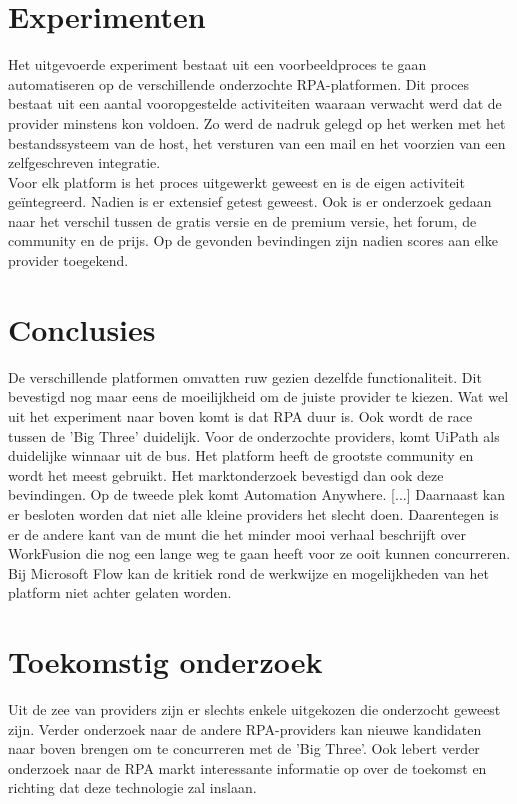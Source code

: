 \documentclass[a0,portrait]{a0poster}
\begin{document}
\begin{multicols}{2}
\section*{Experimenten}
\color{black}
Het uitgevoerde experiment bestaat uit een voorbeeldproces te gaan automatiseren op de verschillende onderzochte RPA-platformen. Dit proces bestaat uit een aantal vooropgestelde activiteiten waaraan verwacht werd dat de provider minstens kon voldoen. Zo werd de nadruk gelegd op het werken met het bestandssysteem van de host, het versturen van een mail en het voorzien van een zelfgeschreven integratie.\\
Voor elk platform is het proces uitgewerkt geweest en is de eigen activiteit geïntegreerd. Nadien is er extensief getest geweest. Ook is er onderzoek gedaan naar het verschil tussen de gratis versie en de premium versie, het forum, de community en de prijs. Op de gevonden bevindingen zijn nadien scores aan elke provider toegekend.

\color{HoGentAccent1} 
\section*{Conclusies}
\color{black}
De verschillende platformen omvatten ruw gezien dezelfde functionaliteit. Dit bevestigd nog maar eens de moeilijkheid om de juiste provider te kiezen. Wat wel uit het experiment naar boven komt is dat RPA duur is. Ook wordt de race tussen de 'Big Three' duidelijk. Voor de onderzochte providers, komt UiPath als duidelijke winnaar uit de bus. Het platform heeft de grootste community en wordt het meest gebruikt. Het marktonderzoek bevestigd dan ook deze bevindingen. Op de tweede plek komt Automation Anywhere. [...] Daarnaast kan er besloten worden dat niet alle kleine providers het slecht doen. Daarentegen is er de andere kant van de munt die het minder mooi verhaal beschrijft over WorkFusion die nog een lange weg te gaan heeft voor ze ooit kunnen concurreren. Bij Microsoft Flow kan de kritiek rond de werkwijze en mogelijkheden van het platform niet achter gelaten worden.

\color{HoGentAccent1} 
\section*{Toekomstig onderzoek}
\color{black}
Uit de zee van providers zijn er slechts enkele uitgekozen die onderzocht geweest zijn. Verder onderzoek naar de andere RPA-providers kan nieuwe kandidaten naar boven brengen om te concurreren met de 'Big Three'. Ook lebert verder onderzoek naar de RPA markt interessante informatie op over de toekomst en richting dat deze technologie zal inslaan.


\end{multicols}
\end{document}
